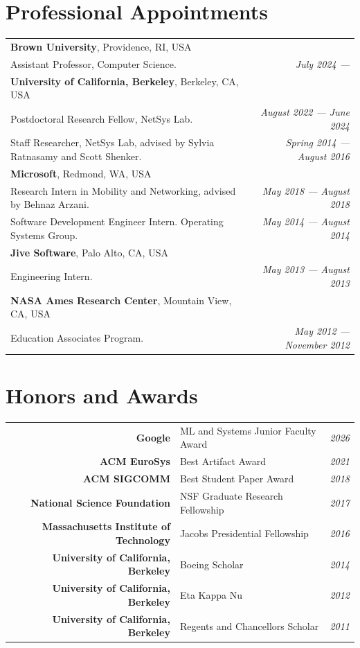\section{Professional Appointments}
\begin{tabular*}{\textwidth}{@{\hspace{1cm}}l@{\extracolsep{\fill}}r@{}}
\textbf{Brown University}, Providence, RI, USA  &\\
Assistant Professor, Computer Science. & \emph{July 2024 ---} \\
%
\noindent \textbf{University of California, Berkeley}, Berkeley, CA, USA &\\
Postdoctoral Research Fellow, NetSys Lab. & \emph{August 2022 --- June 2024} \\
Staff Researcher, NetSys Lab, advised by Sylvia Ratnasamy and Scott Shenker. & \emph{Spring 2014 --- August 2016}\\
%
\textbf{Microsoft}, Redmond, WA, USA &\\
Research Intern in Mobility and Networking, advised by Behnaz Arzani. & \emph{May 2018 --- August 2018} \\
Software Development Engineer Intern. Operating Systems Group. & \emph{May 2014 --- August 2014}\\
%
\textbf{Jive Software}, Palo Alto, CA, USA &\\
Engineering Intern. & \emph{May 2013 --- August 2013}\\
%
\textbf{NASA Ames Research Center}, Mountain View, CA, USA &\\
Education Associates Program. & \emph{May 2012 --- November 2012}\\
\end{tabular*}

\section{Honors and Awards}
\begin{tabular*}{\textwidth}{@{\hspace{1cm}}r@{\hspace{5pt}}l@{\extracolsep{\fill}}r@{}}
\textbf{Google}          & ML and Systems Junior Faculty Award & \emph{2026} \\
\textbf{ACM EuroSys}     & Best Artifact Award              & \emph{2021} \\
\textbf{ACM SIGCOMM}     & Best Student Paper Award         & \emph{2018} \\
\textbf{National Science Foundation}         & NSF Graduate Research Fellowship & \emph{2017} \\
\textbf{Massachusetts Institute of Technology}         & Jacobs Presidential Fellowship   & \emph{2016} \\
\textbf{University of California, Berkeley} & Boeing Scholar                   & \emph{2014} \\
\textbf{University of California, Berkeley} & Eta Kappa Nu                     & \emph{2012} \\
\textbf{University of California, Berkeley} & Regents and Chancellors Scholar  & \emph{2011} \\
\end{tabular*}
